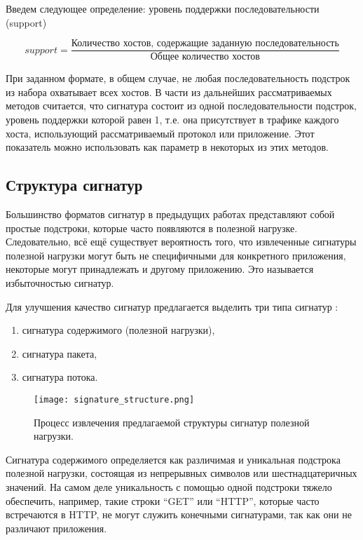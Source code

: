 Введем следующее определение: уровень поддержки последовательности (support)

\[ support = \dfrac{\text{Количество хостов, содержащие заданную последовательность}}{\text{Общее количество хостов}} \]

При заданном формате, в общем случае, не любая последовательность подстрок из набора охватывает всех хостов.
В части из дальнейших рассматриваемых методов считается, что сигнатура состоит из одной последовательности подстрок, уровень поддержки которой равен 1,
т.е. она присутствует в трафике каждого хоста, использующий рассматриваемый протокол или приложение.
Этот показатель можно использовать как параметр в некоторых из этих методов.

\subsection{Структура сигнатур}

Большинство форматов сигнатур в предыдущих работах \cite{park2008towards,ye2009autosig,santosautomatic} представляют собой простые подстроки, которые часто появляются в полезной нагрузке.
Следовательно, всё ещё существует вероятность того, что извлеченные сигнатуры полезной нагрузки могут быть не специфичными для конкретного приложения,
некоторые могут принадлежать и другому приложению. Это называется избыточностью сигнатур.

Для улучшения качество сигнатур предлагается выделить три типа сигнатур \cite{goo2016payload, shim2019automatic}:

\begin{enumerate}
    \item сигнатура содержимого (полезной нагрузки),
    \item сигнатура пакета,
    \item сигнатура потока.
\end{enumerate}

\begin{figure}[h!]
    \begin{center}
        \texttt{[image: signature\_structure.png]}
        \caption{Процесс извлечения предлагаемой структуры сигнатур полезной нагрузки.}
    \end{center}
\end{figure}

Сигнатура содержимого определяется как различимая и уникальная подстрока полезной нагрузки, состоящая из непрерывных символов или шестнадцатеричных значений.
На самом деле уникальность с помощью одной подстроки тяжело обеспечить, например, такие строки ``GET''  или ``HTTP'', которые часто встречаются в HTTP,
не могут служить конечными сигнатурами, так как они не различают приложения.

